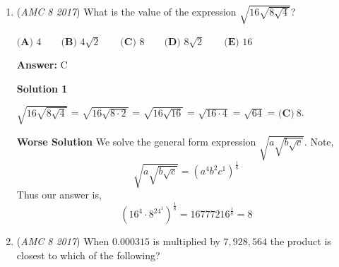 \begin{enumerate}
$\textbf{(A) }70\qquad\textbf{(B) }84\qquad\textbf{(C) }100\qquad\textbf{(D) }106\qquad\textbf{(E) }120$

 \textbf{Answer: }E



\textbf{Solution 1}

Let $x$ be the total amount of votes casted. From the chart, Brenda received $30\%$ of the votes and had $36$ votes. We can express this relationship as $\frac{30}{100}x=36$. Solving for $x$, we get $x=\boxed{\textbf{(E)}\ 120}.$




\textbf{Solution 2}

We're being asked for the total number of votes cast -- that represents $100\%$ of the total number of votes. Brenda received $36$ votes, which is $\frac{30}{100} = \frac{3}{10}$ of the total number of votes. Multiplying $36$ by $\frac{10}{3},$ we get the total number of votes, which is $\boxed{\textbf{(E)}\ 120}.$




\textbf{Solution 3}

If $36$ votes is $\frac{3}{10}$ of all the votes, we can divide that by $3$ to get $12$ as 10\%, and then we can multiply the $12$ by $10$ to get to $120$. So, the answer is $\boxed{\textbf{(E)}\ 120}.$



	\item (\textit{AMC 8 2017}) What is the value of the expression $\sqrt{16\sqrt{8\sqrt{4}}}$?


 $\textbf{(A) }4\qquad\textbf{(B) }4\sqrt{2}\qquad\textbf{(C) }8\qquad\textbf{(D) }8\sqrt{2}\qquad\textbf{(E) }16$

 \textbf{Answer: }C



\textbf{Solution 1}

$\sqrt{16\sqrt{8\sqrt{4}}}$ = $\sqrt{16\sqrt{8\cdot 2}}$ = $\sqrt{16\sqrt{16}}$ = $\sqrt{16\cdot 4}$ = $\sqrt{64}$ = $\boxed{\textbf{(C)}\ 8}$.

 \textbf{Worse Solution} We solve the general form expression $\sqrt{a\sqrt{b\sqrt{c}}}$. Note, 
 \[\sqrt{a\sqrt{b\sqrt{c}}}=(a^4b^2c^1)^\frac{1}{8}\]Thus our answer is, 
 \[(16^4\cdot8^24^1)^\frac{1}{8}=16777216^{\frac{1}{8}}=8\]



	\item (\textit{AMC 8 2017}) When $0.000315$ is multiplied by $7,928,564$ the product is closest to which of the following?



\end{enumerate}
